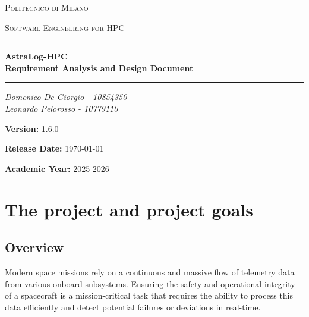 \documentclass[11pt, a4paper]{article}
\begin{document}
\begin{titlepage}
    \centering
    \vspace*{2cm}

    {\scshape\LARGE Politecnico di Milano \par}
    \vspace{1cm}
    {\scshape\Large Software Engineering for HPC\par}
    \vspace{1.5cm}

    \hrule
    \vspace{0.5cm}
    {\huge\bfseries AstraLog-HPC \\ \vspace{0.3cm} \Large Requirement Analysis and Design Document \par}
    \vspace{0.5cm}
    \hrule

    \vspace{2cm}

    {\Large\itshape
    Domenico De Giorgio - 10854350 \\
    Leonardo Pelorosso - 10779110 \par}

    \vfill

    {\large \textbf{Version:} 1.6.0 \par}
    {\large \textbf{Release Date:} \today \par}
    {\large \textbf{Academic Year:} 2025-2026 \par}
\end{titlepage}

\newpage
\tableofcontents
\newpage


\section{The project and project goals}

\subsection*{Overview}
Modern space missions rely on a continuous and massive flow of telemetry data from various onboard subsystems. Ensuring the safety and operational integrity of a spacecraft is a mission-critical task that requires the ability to process this data efficiently and detect potential failures or deviations in real-time.
\end{document}
